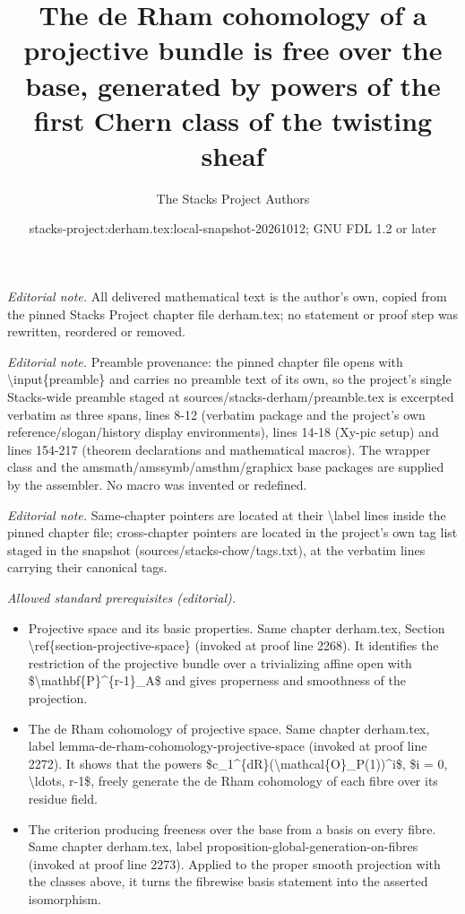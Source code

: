 \documentclass[10pt,a4paper]{amsart}
\title{The de Rham cohomology of a projective bundle is free over the base, generated by powers of the first Chern class of the twisting sheaf}
\author{The Stacks Project Authors}
\date{stacks-project:derham.tex:local-snapshot-20261012; GNU FDL 1.2 or later}
\theoremstyle{plain}
\theoremstyle{definition}
\theoremstyle{remark}
\numberwithin{equation}{subsection}
\begin{document}
\maketitle
\noindent\textit{Editorial note.} All delivered mathematical text is the author's own, copied from the pinned Stacks Project chapter file derham.tex; no statement or proof step was rewritten, reordered or removed.\par\medskip
\noindent\textit{Editorial note.} Preamble provenance: the pinned chapter file opens with \textbackslash{}input\{preamble\} and carries no preamble text of its own, so the project's single Stacks-wide preamble staged at sources/stacks-derham/preamble.tex is excerpted verbatim as three spans, lines 8-12 (verbatim package and the project's own reference/slogan/history display environments), lines 14-18 (Xy-pic setup) and lines 154-217 (theorem declarations and mathematical macros). The wrapper class and the amsmath/amssymb/amsthm/graphicx base packages are supplied by the assembler. No macro was invented or redefined.\par\medskip
\noindent\textit{Editorial note.} Same-chapter pointers are located at their \textbackslash{}label lines inside the pinned chapter file; cross-chapter pointers are located in the project's own tag list staged in the snapshot (sources/stacks-chow/tags.txt), at the verbatim lines carrying their canonical tags.\par\medskip
\noindent\textit{Allowed standard prerequisites (editorial).}\begin{itemize}
\item Projective space and its basic properties. Same chapter derham.tex, Section \textbackslash{}ref\{section-projective-space\} (invoked at proof line 2268). It identifies the restriction of the projective bundle over a trivializing affine open with \$\textbackslash{}mathbf\{P\}\textasciicircum{}\{r-1\}\_A\$ and gives properness and smoothness of the projection.
\item The de Rham cohomology of projective space. Same chapter derham.tex, label lemma-de-rham-cohomology-projective-space (invoked at proof line 2272). It shows that the powers \$c\_1\textasciicircum{}\{dR\}(\textbackslash{}mathcal\{O\}\_P(1))\textasciicircum{}i\$, \$i = 0, \textbackslash{}ldots, r-1\$, freely generate the de Rham cohomology of each fibre over its residue field.
\item The criterion producing freeness over the base from a basis on every fibre. Same chapter derham.tex, label proposition-global-generation-on-fibres (invoked at proof line 2273). Applied to the proper smooth projection with the classes above, it turns the fibrewise basis statement into the asserted isomorphism.
\end{itemize}\medskip
\end{document}
